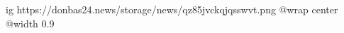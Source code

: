  
 
 
 
 

\ifcmt
  ig https://donbas24.news/storage/news/qz85jvckqjqsswvt.png
  @wrap center
  @width 0.9
\fi
